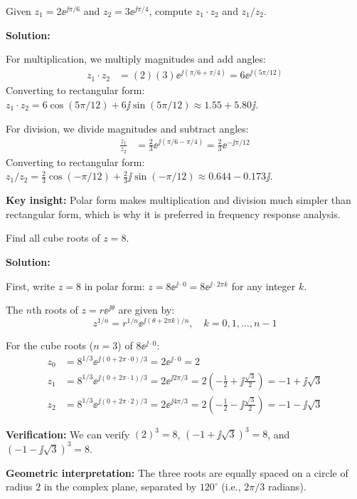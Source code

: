 \begin{examplebox}[title=Example 0.2: Multiplication and Division in Polar Form]
Given $z_1 = 2\ee^{\jj\pi/6}$ and $z_2 = 3\ee^{\jj\pi/4}$, compute $z_1 \cdot z_2$ and $z_1 / z_2$.

\textbf{Solution:}

For multiplication, we multiply magnitudes and add angles:
\begin{align}
z_1 \cdot z_2 &= (2)(3) \ee^{\jj(\pi/6 + \pi/4)} = 6\ee^{\jj(5\pi/12)}
\end{align}
Converting to rectangular form: $z_1 \cdot z_2 = 6\cos(5\pi/12) + 6\jj\sin(5\pi/12) \approx 1.55 + 5.80\jj$.

For division, we divide magnitudes and subtract angles:
\begin{align}
\frac{z_1}{z_2} &= \frac{2}{3} \ee^{\jj(\pi/6 - \pi/4)} = \frac{2}{3}\ee^{-\jj\pi/12}
\end{align}
Converting to rectangular form: $z_1/z_2 = \frac{2}{3}\cos(-\pi/12) + \frac{2}{3}\jj\sin(-\pi/12) \approx 0.644 - 0.173\jj$.

\textbf{Key insight:} Polar form makes multiplication and division much simpler than rectangular form, which is why it is preferred in frequency response analysis.
\end{examplebox}

\begin{examplebox}[title=Example 0.3: Finding All Cube Roots of a Complex Number]
Find all cube roots of $z = 8$.

\textbf{Solution:}

First, write $z = 8$ in polar form: $z = 8\ee^{\jj \cdot 0} = 8\ee^{\jj \cdot 2\pi k}$ for any integer $k$.

The $n$th roots of $z = r\ee^{\jj\theta}$ are given by:
\begin{equation*}
z^{1/n} = r^{1/n} \ee^{\jj(\theta + 2\pi k)/n}, \quad k = 0, 1, \ldots, n-1
\end{equation*}

For the cube roots ($n = 3$) of $8\ee^{\jj \cdot 0}$:
\begin{align}
z_0 &= 8^{1/3} \ee^{\jj(0 + 2\pi \cdot 0)/3} = 2\ee^{\jj \cdot 0} = 2 \\
z_1 &= 8^{1/3} \ee^{\jj(0 + 2\pi \cdot 1)/3} = 2\ee^{\jj 2\pi/3} = 2\left(-\frac{1}{2} + \jj\frac{\sqrt{3}}{2}\right) = -1 + \jj\sqrt{3} \\
z_2 &= 8^{1/3} \ee^{\jj(0 + 2\pi \cdot 2)/3} = 2\ee^{\jj 4\pi/3} = 2\left(-\frac{1}{2} - \jj\frac{\sqrt{3}}{2}\right) = -1 - \jj\sqrt{3}
\end{align}

\textbf{Verification:} We can verify $(2)^3 = 8$, $(-1 + \jj\sqrt{3})^3 = 8$, and $(-1 - \jj\sqrt{3})^3 = 8$.

\textbf{Geometric interpretation:} The three roots are equally spaced on a circle of radius $2$ in the complex plane, separated by $120^{\circ}$ (i.e., $2\pi/3$ radians).
\end{examplebox}

